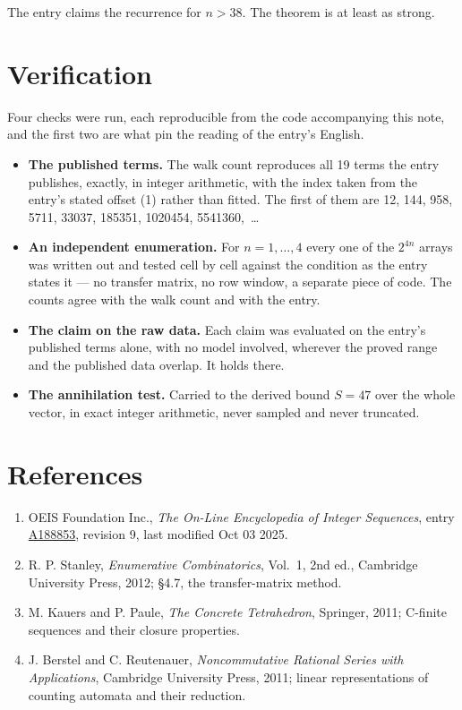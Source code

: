 \documentclass[11pt]{article}
\theoremstyle{definition}
\begin{document}
The entry claims the recurrence for $n > 38$. The theorem is at least as strong.

\section{Verification}

Four checks were run, each reproducible from the code accompanying this note, and the first two are what pin the reading of the entry's English.

\begin{itemize}

\item {\bfseries The published terms.} The walk count reproduces all 19 terms the entry publishes, exactly, in integer arithmetic, with the index taken from the entry's stated offset (1) rather than fitted. The first of them are 12, 144, 958, 5711, 33037, 185351, 1020454, 5541360,~\dots

\item {\bfseries An independent enumeration.} For $n = 1,\dots,4$ every one of the $2^{4n}$ arrays was written out and tested cell by cell against the condition as the entry states it --- no transfer matrix, no row window, a separate piece of code. The counts agree with the walk count and with the entry.

\item {\bfseries The claim on the raw data.} Each claim was evaluated on the entry's published terms alone, with no model involved, wherever the proved range and the published data overlap. It holds there.

\item {\bfseries The annihilation test.} Carried to the derived bound $S = 47$ over the whole vector, in exact integer arithmetic, never sampled and never truncated.

\end{itemize}

\section{References}

\begin{enumerate}

\item OEIS Foundation Inc., \emph{The On-Line Encyclopedia of Integer Sequences}, entry \href{https://oeis.org/A188853}{A188853}, revision 9, last modified Oct 03 2025.

\item R. P. Stanley, \emph{Enumerative Combinatorics}, Vol.~1, 2nd ed., Cambridge University Press, 2012; \S4.7, the transfer-matrix method.

\item M. Kauers and P. Paule, \emph{The Concrete Tetrahedron}, Springer, 2011; C-finite sequences and their closure properties.

\item J. Berstel and C. Reutenauer, \emph{Noncommutative Rational Series with Applications}, Cambridge University Press, 2011; linear representations of counting automata and their reduction.

\end{enumerate}
\end{document}

